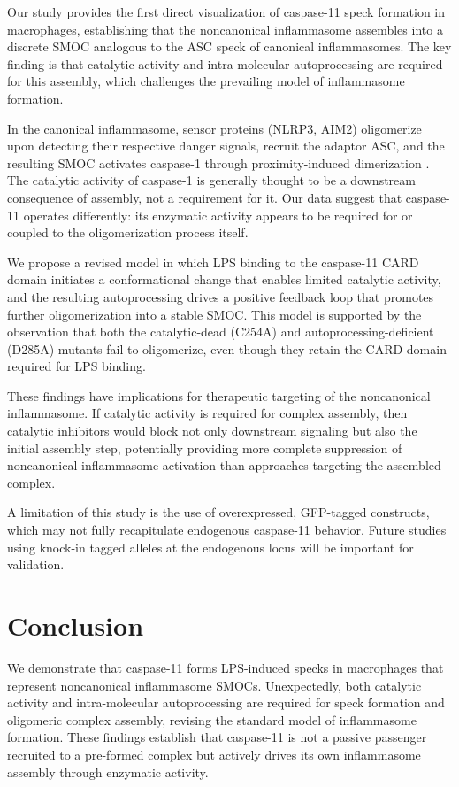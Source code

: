 \documentclass[11pt]{article}
\begin{document}
Our study provides the first direct visualization of caspase-11 speck formation in macrophages, establishing that the noncanonical inflammasome assembles into a discrete SMOC analogous to the ASC speck of canonical inflammasomes. The key finding is that catalytic activity and intra-molecular autoprocessing are required for this assembly, which challenges the prevailing model of inflammasome formation.

In the canonical inflammasome, sensor proteins (NLRP3, AIM2) oligomerize upon detecting their respective danger signals, recruit the adaptor ASC, and the resulting SMOC activates caspase-1 through proximity-induced dimerization \citep{lu2014unified}. The catalytic activity of caspase-1 is generally thought to be a downstream consequence of assembly, not a requirement for it. Our data suggest that caspase-11 operates differently: its enzymatic activity appears to be required for or coupled to the oligomerization process itself.

We propose a revised model in which LPS binding to the caspase-11 CARD domain initiates a conformational change that enables limited catalytic activity, and the resulting autoprocessing drives a positive feedback loop that promotes further oligomerization into a stable SMOC. This model is supported by the observation that both the catalytic-dead (C254A) and autoprocessing-deficient (D285A) mutants fail to oligomerize, even though they retain the CARD domain required for LPS binding.

These findings have implications for therapeutic targeting of the noncanonical inflammasome. If catalytic activity is required for complex assembly, then catalytic inhibitors would block not only downstream signaling but also the initial assembly step, potentially providing more complete suppression of noncanonical inflammasome activation than approaches targeting the assembled complex.

A limitation of this study is the use of overexpressed, GFP-tagged constructs, which may not fully recapitulate endogenous caspase-11 behavior. Future studies using knock-in tagged alleles at the endogenous locus will be important for validation.

\section{Conclusion}

We demonstrate that caspase-11 forms LPS-induced specks in macrophages that represent noncanonical inflammasome SMOCs. Unexpectedly, both catalytic activity and intra-molecular autoprocessing are required for speck formation and oligomeric complex assembly, revising the standard model of inflammasome formation. These findings establish that caspase-11 is not a passive passenger recruited to a pre-formed complex but actively drives its own inflammasome assembly through enzymatic activity.



\end{document}
